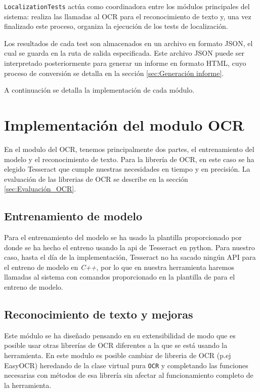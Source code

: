 \texttt{LocalizationTests} actúa como coordinadora entre los módulos principales del sistema: realiza las llamadas al OCR para el reconocimiento de texto y, una vez finalizado este proceso, organiza la ejecución de los tests de localización.

Los resultados de cada test son almacenados en un archivo en formato JSON, el cual se guarda en la ruta de salida especificada. Este archivo JSON puede ser interpretado posteriormente para generar un informe en formato HTML, cuyo proceso de conversión se detalla en la sección \ref{sec:Generación informe}.

A continuación se detalla la implementación de cada módulo.
\section{Implementación del modulo OCR}
\label{sec:Implementación del OCR}
En el modulo del OCR, tenemos principalmente dos partes, el entrenamiento del modelo y el reconocimiento de texto. Para la librería de OCR, en este caso se ha elegido Tesseract que cumple nuestras necesidades en tiempo y en precisión. La evaluación de las librerias de OCR se describe en la sección \ref{sec:Evaluación_OCR}.
\subsection{Entrenamiento de modelo}
Para el entrenamiento del modelo se ha usado la plantilla proporcionado por \cite{Joseda} donde se ha hecho el entreno usando la api de Tesseract en python. Para nuestro caso, hasta el día de la implementación, Tesseract no ha sacado ningún API para el entreno de modelo en \emph{C++}, por lo que en nuestra herramienta haremos llamadas al sistema con comandos proporcionado en la plantilla de \cite{Joseda} para el entreno de modelo.
\subsection{Reconocimiento de texto y mejoras}
Este módulo se ha diseñado pensando en su extensibilidad de modo que es posible usar otras librerías de OCR diferentes a la que se está usando la herramienta.
En este modulo es posible cambiar de libreria de OCR (p.ej EasyOCR) heredando de la clase virtual pura \texttt{OCR} y completando las funciones necesarias con métodos de esa librería sin afectar al funcionamiento completo de la herramienta. 

